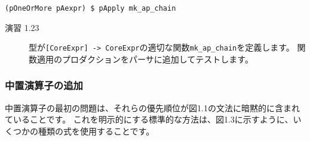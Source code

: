 \documentclass{jarticle}
\begin{document}
\begin{verbatim}
(pOneOrMore pAexpr) $ pApply mk_ap_chain
\end{verbatim}

\begin{description}
	\item[演習 1.23] 型が\texttt{[CoreExpr] -> CoreExpr}の適切な関数\texttt{mk\_ap\_chain}を定義します。
		関数適用のプロダクションをパーサに追加してテストします。
\end{description}

\subsubsection{中置演算子の追加}

中置演算子の最初の問題は、それらの優先順位が図1.1の文法に暗黙的に含まれていることです。
これを明示的にする標準的な方法は、図1.3に示すように、いくつかの種類の式を使用することです。
\end{document}
